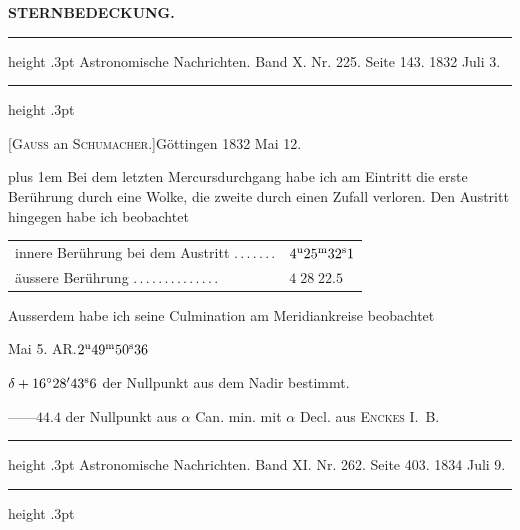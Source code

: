 \clearpage
\thispagestyle{empty}
\noindent{}%
\makebox[12mm][l]{}%
\parbox[t]{\dimexpr\linewidth-24mm\relax}{\centering\footnotesize\bfseries STERNBEDECKUNG.\par}%
\par\nobreak\medskip
\begin{center}
\parbox{.74\linewidth}{%
\centering\small
\hrule height .3pt\relax\vspace{2.5pt}
Astronomische Nachrichten. Band X. Nr. 225. Seite 143. 1832 Juli 3.\par
\vspace{2.5pt}\hrule height .3pt\relax
}
\end{center}

\begin{center}[\textsc{Gauss} an \textsc{Schumacher.}]\quad Göttingen 1832 Mai 12.\end{center}

{\rightskip=0pt plus 1em Bei dem letzten Mercursdurchgang habe ich am Eintritt die erste Berührung durch eine Wolke, die zweite durch einen Zufall verloren. Den Austritt hingegen habe ich beobachtet\par}

\begin{center}
\begin{tabular}{ll}
innere Berührung bei dem Austritt \mbox{.\,.\,.\,.\,.\,.\,.} & $4^{\rm u}25^{\rm m}32^{\rm s}1$ \\
äussere Berührung \mbox{.\,.\,.\,.\,.\,.\,.\,.\,.\,.\,.\,.\,.\,.} & $4\;28\;22.5$ \\
\end{tabular}
\end{center}

Ausserdem habe ich seine Culmination am Meridiankreise beobachtet

\medskip
\noindent Mai 5. AR.\quad $2^{\rm u}49^{\rm m}50^{\rm s}36$\par
\noindent $\delta+16^\circ28'43^{\rm s}6$ der Nullpunkt aus dem Nadir bestimmt.\par
\noindent\hspace*{1em}---\quad ---\quad $44.4$ der Nullpunkt aus $\alpha$ Can. min. mit $\alpha$ Decl. aus \textsc{Enckes} \mbox{I. B.}

\par\bigskip
{}
\hypertarget{native-468-pallas}{}
\begin{center}
\parbox{.75\linewidth}{%
\centering\small
\hrule height .3pt\relax\vspace{2.5pt}
Astronomische Nachrichten. Band XI. Nr. 262. Seite 403. 1834 Juli 9.\par
\vspace{2.5pt}\hrule height .3pt\relax
}
\end{center}


